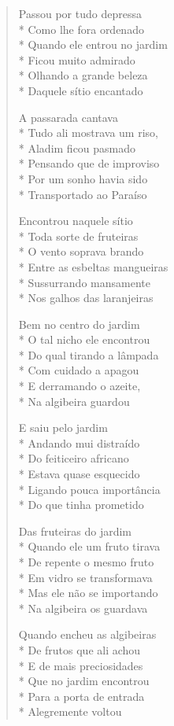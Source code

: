 \begin{verse}
Passou por tudo depressa\\*
Como lhe fora ordenado\\*
Quando ele entrou no jardim\\*
Ficou muito admirado\\*
Olhando a grande beleza\\*
Daquele sítio encantado

A passarada cantava\\*
Tudo ali mostrava um riso,\\*
Aladim ficou pasmado\\*
Pensando que de improviso\\*
Por um sonho havia sido\\*
Transportado ao Paraíso

Encontrou naquele sítio\\*
Toda sorte de fruteiras\\*
O vento soprava brando\\*
Entre as esbeltas mangueiras\\*
Sussurrando mansamente\\*
Nos galhos das laranjeiras

Bem no centro do jardim\\*
O tal nicho ele encontrou\\*
Do qual tirando a lâmpada\\*
Com cuidado a apagou\\*
E derramando o azeite,\\*
Na algibeira guardou

E saiu pelo jardim\\*
Andando mui distraído\\*
Do feiticeiro africano\\*
Estava quase esquecido\\*
Ligando pouca importância\\*
Do que tinha prometido

Das fruteiras do jardim\\*
Quando ele um fruto tirava\\*
De repente o mesmo fruto\\*
Em vidro se transformava\\*
Mas ele não se importando\\*
Na algibeira os guardava

Quando encheu as algibeiras\\*
De frutos que ali achou\\*
E de mais preciosidades\\*
Que no jardim encontrou\\*
Para a porta de entrada\\*
Alegremente voltou


\end{verse}
